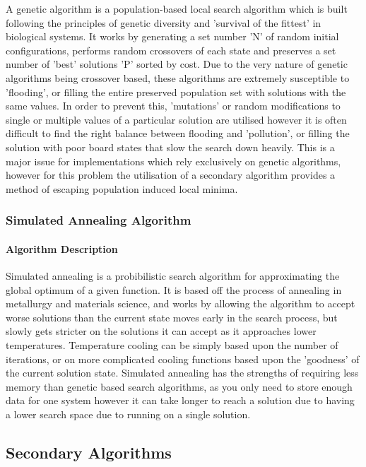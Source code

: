 \documentclass[9pt]{article}
\begin{document}
A genetic algorithm is a population-based local search algorithm which is built following the principles of genetic diversity and 'survival of the fittest' in biological systems. It works by generating a set number 'N' of random initial configurations, performs random crossovers of each state and preserves a set number of 'best' solutions 'P' sorted by cost. Due to the very nature of genetic algorithms being crossover based, these algorithms are extremely susceptible to 'flooding', or filling the entire preserved population set with solutions with the same values. In order to prevent this, 'mutations' or random modifications to single or multiple values of a particular solution are utilised however it is often difficult to find the right balance between flooding and 'pollution', or filling the solution with poor board states that slow the search down heavily. This is a major issue for implementations which rely exclusively on genetic algorithms, however for this problem the utilisation of a secondary algorithm provides a method of escaping population induced local minima.

\subsubsection{Simulated Annealing Algorithm}

\paragraph{Algorithm Description}

Simulated annealing is a probibilistic search algorithm for approximating the global optimum of a given function. It is based off the process of annealing in metallurgy and materials science, and works by allowing the algorithm to accept worse solutions than the current state moves early in the search process, but slowly gets stricter on the solutions it can accept as it approaches lower temperatures. Temperature cooling can be simply based upon the number of iterations, or on more complicated cooling functions based upon the 'goodness' of the current solution state.  Simulated annealing has the strengths of requiring less memory than genetic based search algorithms, as you only need to store enough data for one system however it can take longer to reach a solution due to having a lower search space due to running on a single solution. 

\subsection{Secondary Algorithms}
\end{document}
